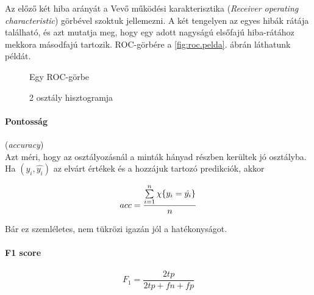 



Az előző két hiba arányát a Vevő működési karakterisztika \cite{rocanalysis} (\textit{Receiver operating characteristic}) görbével szoktuk jellemezni. A két tengelyen az egyes hibák rátája található, és azt mutatja meg, hogy egy adott nagyságú elsőfajú hiba-rátához mekkora másodfajú tartozik. ROC-görbére a \ref{fig:roc.pelda}. ábrán láthatunk példát.


\begin{figure}[h!]
	
	
	\begin{minipage}[c]{0.5\linewidth}
		\centering
		
		\caption{Egy ROC-görbe}
		\label{fig:roc.pelda}
		
	\end{minipage}\hfill
	\begin{minipage}[c]{0.5\linewidth}
		\centering
		
		\caption{2 osztály hisztogramja}
		\label{fig:hist.pelda}
		
	\end{minipage}
	
\end{figure}



\paragraph{Pontosság} (\textit{accuracy}) \\
Azt méri, hogy az osztályozásnál a minták hányad részben
kerültek jó osztályba.
Ha $ (y_i, \hat{y_i}) $ az elvárt értékek és a hozzájuk tartozó 
predikciók, akkor

\[  acc = \dfrac{\sum\limits_{{i}=1}^{n} \chi\{y_i = \hat{y_i}\}}{n}  \]

\noindent
Bár ez szemléletes, nem tükrözi igazán jól a hatékonyságot.


\paragraph{F1 score} \mbox{} 

\[  F_1 = \dfrac{2tp}{2tp + fn + fp}  \]

